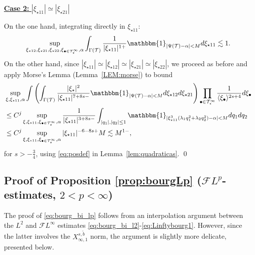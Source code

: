 \documentclass[a4paper,
11pt,  reqno]{amsart}
\newcommand{\5}{\textup{V}}
\newcommand{\noi}{\noindent}
\newcommand{\FL}{\mathcal{F} L}
\newcommand{\wt}{\widetilde}
\theoremstyle{remark}
\newcommand{\bul}{\bullet}
\newcommand{\TT}{\mathcal{T}}
\newcommand{\G}{\Gamma}
\newcommand{\ld}{\lambda}
\newcommand{\jb}[1]
{\langle #1 \rangle}
\numberwithin{equation}{section}
\numberwithin{theorem}{section}
\begin{document}
\smallskip
\noi
\underline{\textbf{Case 2:} $|\xi_{\star11}| \simeq |\xi_{\star21}|$}


 On the one hand, integrating directly in $\xi_{\star11}$:
\begin{align*} 
\sup_{\xi_{\star12}, \xi_{\star21}, \xi_{\star22},  \xi_{\bul\in \TT^\infty_\star},\alpha} \int_{\G(\TT)}\frac{1}{|\xi_{\star11}|^{1+}}\mathbbm{1}_{|\Psi(\TT)-\alpha|<M} d\xi_{\star11} \lesssim 1
.
\end{align*}
On the other hand, since $|\xi_{\star11}| \simeq |\xi_{\star12}|\simeq |\xi_{\star21}|\simeq |\xi_{\star22}|$, 
we proceed as before and apply Morse's Lemma (Lemma~\ref{LEM:morse}) to bound
\begin{align}
&
\sup_{\xi, \xi_{\star11},\alpha} 
\int \left(\int_{\G(\TT)} \frac{|\xi_\star|^2}{|\xi_{\star11}|^{7+8s - }}\mathbbm{1}_{|\Psi(\TT)-\alpha|<M} d\xi_{\star12} d\xi_{\star21} \right)
\prod_{\bul\in \TT^\infty_\star} \frac{1}{\jb{\xi_{\bul}}^{2s+4}} d\xi_\bul
\\
&
\le C^j
\sup_{\xi, \xi_{\star11}, \xi_{\bul\in \TT^\infty_\star},\alpha}
\frac{1}{|\xi_{\star11}|^{3+8s - }}
\int_{|q_1|, |q_2| \le 1} \mathbbm{1}_{|\xi_{\star11}^3(\ld_{1} q_1^2 + \ld_2 q_2^2)-\alpha|<M} dq_1 dq_2\label{eq:L2_44}
\\
&
\le C^j 
\sup_{\xi, \xi_{\star11}, \xi_{\bul\in \TT^\infty_\star},\alpha} |\xi_{\star11}|^{-6-8s+}M \lesssim M^{1-}, 
\end{align} 
for $s>-\frac34$, using \eqref{eq:posdef} in Lemma~\ref{lem:quadraticas}.
\qed

\subsection{Proof of Proposition \ref{prop:bourgLp} ($\FL^p$-estimates, $2<p<\infty$)} 
\label{SUBSEC:bourgainLp}



The proof of \eqref{eq:bourg_bi_lp} follows from an interpolation argument between the $L^2$ and $\FL^\infty$ estimates \eqref{eq:bourg_bi_l2}-\eqref{eq:Linftybourg1}. However, since the latter involves the $X_{\infty,1}^{s,\wt{b}}$ norm, the argument is slightly more delicate, presented below.
\end{document}
